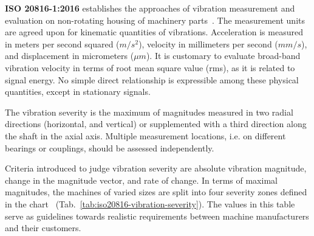 \textbf{ISO 20816-1:2016} establishes the approaches of vibration measurement and evaluation on non-rotating housing of machinery parts~\cite{noauthor_iso_2016}. The measurement units are agreed upon for kinematic quantities of vibrations. Acceleration is measured in meters per second squared ($m/s^2$), velocity in millimeters per second ($mm/s$), and displacement in micrometers ($\mu m$). It is customary to evaluate broad-band vibration velocity in terms of root mean square value (rms), as it is related to signal energy. No simple direct relationship is expressible among these physical quantities, except in stationary signals.

The vibration severity is the maximum of magnitudes measured in two radial directions (horizontal, and vertical) or supplemented with a third direction along the shaft in the axial axis. Multiple measurement locations, i.e. on different bearings or couplings, should be assessed independently.

Criteria introduced to judge vibration severity are absolute vibration magnitude, change in the magnitude vector, and rate of change. In terms of maximal magnitudes, the machines of varied sizes are split into four severity zones defined in the chart ~(Tab.~\ref{tab:iso20816-vibration-severity}). The values in this table serve as guidelines towards realistic requirements between machine manufacturers and their customers.

